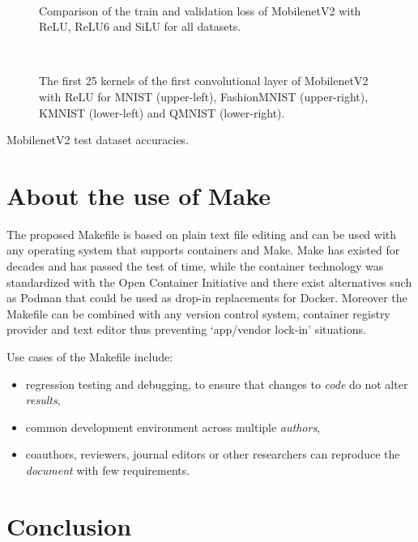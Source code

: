 \documentclass[journal]{IEEEtran}
\begin{document}
\begin{figure}[!t]
	\\
	\caption{Comparison of the train and validation loss of MobilenetV2 with ReLU, ReLU6 and SiLU for all datasets.}\label{fig:loss}
\end{figure}

\begin{figure}[!t]
	\\
	\caption{The first 25 kernels of the first convolutional layer of MobilenetV2 with ReLU for MNIST (upper-left), FashionMNIST (upper-right), KMNIST (lower-left) and QMNIST (lower-right).}\label{fig:kernels}
\end{figure}

\begin{table}[ht]
	\centering
	\caption{MobilenetV2 test dataset accuracies.}\label{table:table}
	\setlength\tabcolsep{4pt}
	
\end{table}

\section{About the use of Make}
The proposed Makefile is based on plain text file editing and can be used with any operating system that supports containers and Make.
Make has existed for decades and has passed the test of time, while the container technology was standardized with the Open Container Initiative and there exist alternatives such as Podman that could be used as drop-in replacements for Docker.
Moreover the Makefile can be combined with any version control system, container registry provider and text editor thus preventing `app/vendor lock-in' situations.

Use cases of the Makefile include:
\begin{itemize}
	\item regression testing and debugging, to ensure that changes to \textit{code} do not alter \textit{results},
	\item common development environment across multiple \textit{authors},
	\item coauthors, reviewers, journal editors or other researchers can reproduce the \textit{document} with few requirements.
\end{itemize}

\section*{Conclusion}



\end{document}
